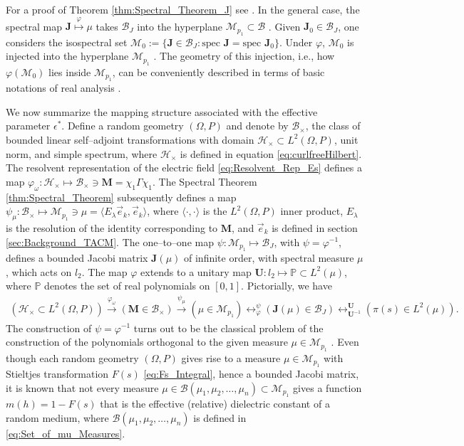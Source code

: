 \documentclass[english,12pt]{ttuthes}
\begin{document}
% 
For a proof of Theorem \ref{thm:Spectral_Theorem_J} see
\cite{Deift:2000:RMT}. In the general case, the spectral map
$\mathbf{J}\stackrel{\varphi}{\mapsto}\mu$ takes $\mathcal{B}_J$ into the
hyperplane $\mathcal{M}_{p_1}\subset\mathscr{B}$
\cite{Deift:2000:RMT}. Given $\mathbf{J}_0\in\mathcal{B}_J$, one
considers the isospectral set
$\mathscr{M}_0:=\{\mathbf{J}\in\mathcal{B}_J:  
                \text{spec }\mathbf{J}=\text{spec }\mathbf{J}_0\}$.
Under $\varphi$, $\mathscr{M}_0$ is injected into the hyperplane
$\mathcal{M}_{p_1}$ \cite{Deift:2000:RMT}. The geometry of this
injection, i.e., how $\varphi(\mathscr{M}_0)$ lies inside
$\mathcal{M}_{p_1}$, can be conveniently described in terms of basic
notations of real analysis \cite{Deift:2000:RMT,Deift:JFA:358}.
  

We now summarize the mapping structure associated with the effective
parameter $\epsilon^*$. Define a random geometry $(\Omega,P)$ and denote by
$\mathcal{B}_\times$, the class of bounded linear self--adjoint
transformations with domain $\mathscr{H}_\times\subset L^2(\Omega,P)$, unit norm,
and simple spectrum, where $\mathscr{H}_\times$ is defined in equation
\eqref{eq:curlfreeHilbert}. The resolvent representation of the  
electric field \eqref{eq:Resolvent_Rep_Es} defines a map
$\varphi_\omega:\mathscr{H}_\times\mapsto\mathcal{B}_\times\ni\mathbf{M}=\chi_1\Gamma\chi_1$. The Spectral
Theorem \ref{thm:Spectral_Theorem} 
subsequently defines a map
$\psi_\mu:\mathcal{B}_\times\mapsto\mathcal{M}_{p_1}\ni\mu=\langle E_\lambda\vec{e}_k,\vec{e}_k\rangle$,
where $\langle\cdot,\cdot\rangle$ is the $L^2(\Omega,P)$ inner product, $E_\lambda$ is the
resolution of the identity corresponding to $\mathbf{M}$, and
$\vec{e}_k$ is defined in section \ref{sec:Background_TACM}. The 
one--to--one map $\psi:\mathcal{M}_{p_1}\mapsto\mathcal{B}_J$, with $\psi=\varphi^{-1}$,
defines a bounded Jacobi matrix $\mathbf{J}(\mu)$ of infinite order, with
spectral measure $\mu$, which acts on $l_2$. The map $\varphi$ extends to a
unitary map $\mathbf{U}:l_2\mapsto\mathbb{P}\subset L^2(\mu)$, where $\mathbb{P}$
denotes the set of real polynomials on $[0,1]$. Pictorially, we have 
%
\begin{align*}
  (\mathscr{H}_\times\subset L^2(\Omega,P))\stackrel{\varphi_\omega}{\longrightarrow}(\mathbf{M}\in\mathcal{B}_\times)
  \stackrel{\psi_\mu}{\longrightarrow}(\mu\in\mathcal{M}_{p_1})
  \mathop{\longleftrightarrow}_{\varphi}^{\psi}(\mathbf{J}(\mu)\in\mathcal{B}_J)
  \mathop{\longleftrightarrow}_{\mathbf{U}^{-1}}^{\mathbf{U}}(\pi(s)\in L^2(\mu)).
\end{align*}
%
The construction of $\psi=\varphi^{-1}$ turns out to be the classical problem of
the construction of the polynomials orthogonal to the given measure
$\mu\in\mathcal{M}_{p_1}$ \cite{Deift:2000:RMT}. Even though each random
geometry $(\Omega,P)$ gives rise to a measure $\mu\in\mathcal{M}_{p_1}$ with
Stieltjes transformation $F(s)$ \eqref{eq:Fs_Integral}, hence a
bounded Jacobi matrix, it is known \cite{Golden:CMP-473} that not
every measure $\mu\in\mathscr{B}(\mu_1,\mu_2,\ldots,\mu_n)\subset\mathcal{M}_{p_1}$ gives a
function $m(h)=1-F(s)$ that is the effective (relative) dielectric
constant of a random medium, where $\mathscr{B}(\mu_1,\mu_2,\ldots,\mu_n)$ is
defined in \eqref{eq:Set_of_mu_Measures}.
  
\end{document}
